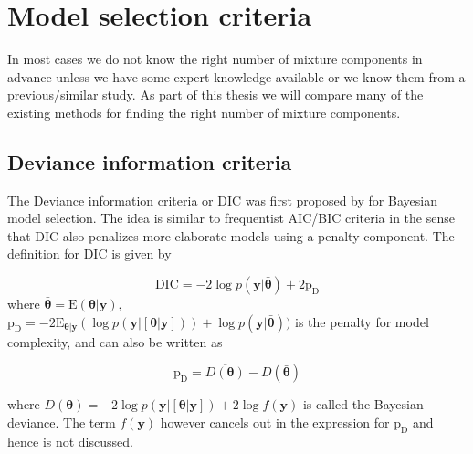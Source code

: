 
\chapter{Model selection criteria}
\label{ch : model_selection}

In most cases we do not know the right number of mixture components in advance unless we have some expert knowledge available or we know them from a previous/similar study. As part of this thesis we will compare many of the existing methods for finding the right number of mixture components.

\section{Deviance information criteria}
\label{sec : dic}

The Deviance information criteria or DIC was first proposed by \citet{spiegelhalter_bayesian_2002} for Bayesian model selection. The idea is similar to frequentist AIC/BIC criteria in the sense that DIC also penalizes more elaborate models using a penalty component. The definition for DIC is given by 

$$\text{DIC} = -2\log{p(\boldsymbol{y}|\boldsymbol{\bar{\theta}})} + 2\text{p}_\text{D}$$
where $\boldsymbol{\bar{\theta}} = \text{E}(\boldsymbol{\theta}|\boldsymbol{y})$,\\
$\text{p}_\text{D} = -2\text{E}_{\boldsymbol{\theta}|\boldsymbol{y}}(\log{p(\boldsymbol{y}|[\boldsymbol{\theta}|\boldsymbol{y}])}) + \log{p(\boldsymbol{y}|\boldsymbol{\bar{\theta}})})$ is the penalty for model complexity, and can also be written as 

$$\text{p}_\text{D}=\overline{D(\boldsymbol{\theta})} - D(\boldsymbol{\bar{\theta}})$$

where $D(\boldsymbol{\theta}) = -2\log{p(\boldsymbol{y}|[\boldsymbol{\theta}|\boldsymbol{y}])} + 2\log{f(\boldsymbol{y})}$ is called the Bayesian deviance. The term $f(\boldsymbol{y})$ however cancels out in the expression for $\text{p}_\text{D}$ and hence is not discussed.


